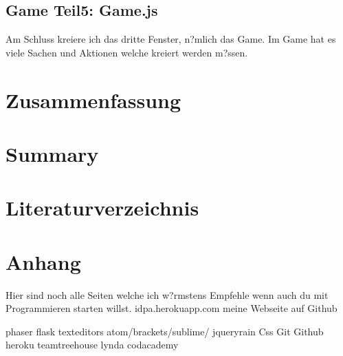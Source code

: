 \documentclass{article}
\begin{document}
\cleardoublepage
\subsection{Game Teil5: Game.js}


Am Schluss kreiere ich das dritte Fenster, n?mlich das Game.
Im Game hat es viele Sachen und Aktionen welche kreiert werden m?ssen.








\cleardoublepage






\section{Zusammenfassung}
\cleardoublepage

\section{Summary}
\cleardoublepage




\section{Literaturverzeichnis}
\cleardoublepage




\appendix
\section{Anhang}
Hier sind noch alle Seiten welche ich w?rmstens Empfehle wenn auch du mit
Programmieren starten willst.
idpa.herokuapp.com
meine Webseite auf Github

phaser
flask
texteditors atom/brackets/sublime/
jqueryrain
Css
Git
Github
heroku
teamtreehouse
lynda
codacademy
\end{document}
